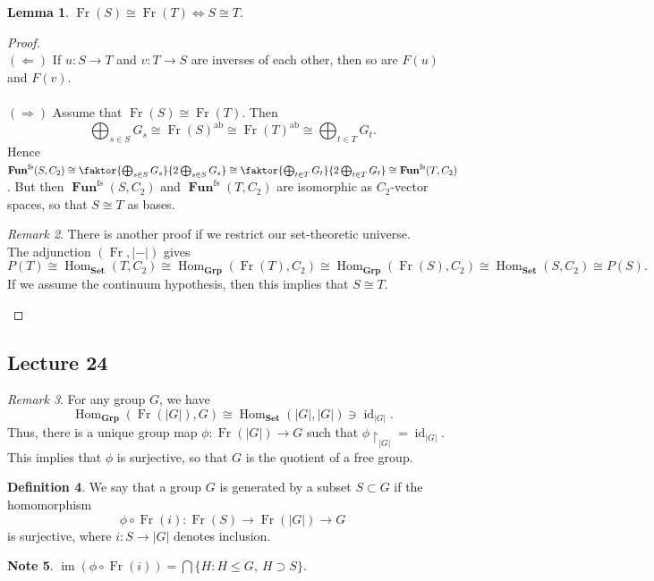 \documentclass[10pt,letterpaper,cm]{nupset}
\theoremstyle{definition}
\newtheorem{definition}{Definition}[subsection]
\newtheorem{note}[definition]{Note}
\theoremstyle{theorem}
\newtheorem{lemma}[definition]{Lemma}
\theoremstyle{remark}
\newtheorem{remark}[definition]{Remark}
\newcommand{\1}{\mathbf{1}}
\newcommand{\0}{\vec 0}
\DeclareMathOperator{\id}{id}
\DeclareMathOperator{\ab}{ab}
\DeclareMathOperator{\im}{im}
\DeclareMathOperator{\fs}{fs}
\DeclareMathOperator{\Hom}{Hom}
\DeclareMathOperator{\Fun}{\mathbf{Fun}}
\DeclareMathOperator{\Fr}{Fr}
\begin{document}
\begin{lemma}\label{l14}
$\Fr(S) \cong \Fr(T) \iff S\cong T.$ 
\end{lemma}
\begin{proof} $ $
\\ $(\Longleftarrow)$ If $u: S \to T$ and $v: T\to S$ are inverses of each other, then so are $F(u)$ and $F(v)$.
\\ \\
$(\Longrightarrow)$ Assume that $\Fr(S) \cong \Fr(T)$. Then $$\bigoplus_{s\in S} G_s \cong \Fr(S)^{\ab} \cong \Fr(T)^{\ab} \cong \bigoplus_{t\in T} G_t.$$ Hence $\Fun^{\fs}(S, C_2)\cong \faktor{\bigoplus_{s\in S} G_s}{2\bigoplus_{s\in S} G_s} \cong \faktor{\bigoplus_{t\in T} G_t}{2\bigoplus_{t\in T} G_t}\cong \Fun^{\fs}(T, C_2)$. But then $\Fun^{\fs}(S, C_2)$ and  $\Fun^{\fs}(T, C_2)$ are isomorphic as $C_2$-vector spaces, so that $S \cong T$ as bases. 
\begin{remark} There is another proof if we restrict our set-theoretic universe.
\\
The adjunction $(\Fr, \lvert - \rvert)$ gives $$P(T) \cong \Hom_{\mathbf{Set}}(T, C_2) \cong \Hom_{\mathbf{Grp}}(\Fr(T), C_2)\cong \Hom_{\mathbf{Grp}}(\Fr(S), C_2)\cong \Hom_{\mathbf{Set}}(S, C_2)\cong P(S).$$
If we assume the continuum hypothesis, then this implies that $S \cong T$.
\end{remark}
\end{proof}

\subsection{Lecture 24}

\begin{remark}
For any group $G$, we have $$\Hom_{\mathbf{Grp}}(\Fr(|G|), G) \cong \Hom_{\mathbf{Set}}(|G|, |G|)\ni \id_{|G|}.$$ Thus, there is a unique group map $\phi : \Fr(|G|) \to G$ such that $\phi \restriction_{|G|} = \id_{|G|}$. This implies that $\phi$ is surjective, so that $G$ is the quotient of a free group.
\end{remark}

\begin{definition}
We say that a group $G$ is generated by a subset $S\subset G$ if the homomorphism $$\phi \circ \Fr(i):\Fr(S) \to \Fr(|G|) \to G$$ is surjective, where $i: S \to |G|$ denotes inclusion.
\end{definition}

\begin{note}
$\im(\phi \circ \Fr(i)) = \bigcap \{H : H \leq G, \ H \supset S\}$.
\end{note}
\end{document}

